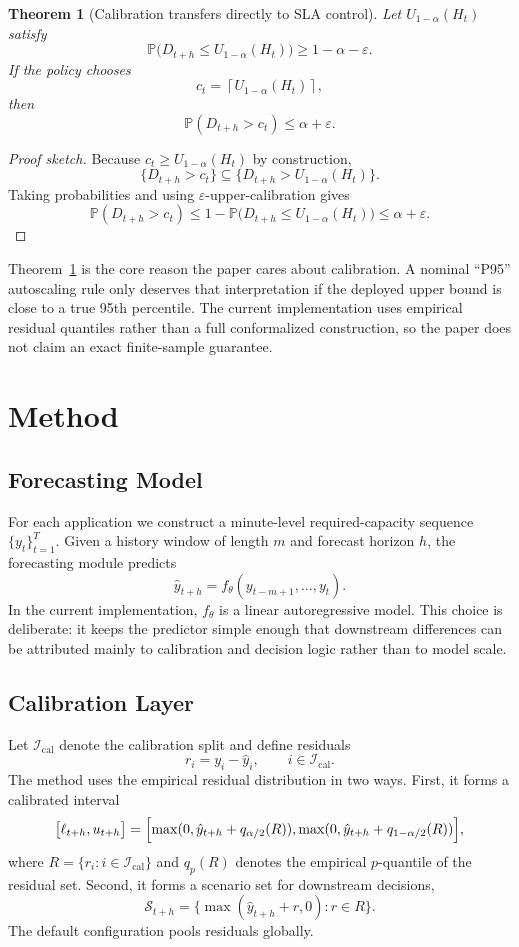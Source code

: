 \documentclass[11pt]{article}
\theoremstyle{plain}
\newtheorem{theorem}{Theorem}[section]
\theoremstyle{definition}
\theoremstyle{remark}
\begin{document}
\begin{theorem}[Calibration transfers directly to SLA control]
\label{thm:calibration-to-sla}
Let $U_{1-\alpha}(H_t)$ satisfy
\[
\mathbb{P}\!\bigl(D_{t+h} \le U_{1-\alpha}(H_t)\bigr) \ge 1-\alpha-\varepsilon.
\]
If the policy chooses
\[
c_t = \left\lceil U_{1-\alpha}(H_t) \right\rceil,
\]
then
\[
\mathbb{P}(D_{t+h} > c_t) \le \alpha + \varepsilon.
\]
\end{theorem}
\begin{proof}[Proof sketch]
Because $c_t \ge U_{1-\alpha}(H_t)$ by construction,
\[
\{D_{t+h} > c_t\} \subseteq \{D_{t+h} > U_{1-\alpha}(H_t)\}.
\]
Taking probabilities and using $\varepsilon$-upper-calibration gives
\[
\mathbb{P}(D_{t+h} > c_t)
\le
1 - \mathbb{P}\!\bigl(D_{t+h} \le U_{1-\alpha}(H_t)\bigr)
\le
\alpha + \varepsilon.
\]
\end{proof}

Theorem~\ref{thm:calibration-to-sla} is the core reason the paper cares about calibration. A nominal ``P95'' autoscaling rule only deserves that interpretation if the deployed upper bound is close to a true 95th percentile. The current implementation uses empirical residual quantiles rather than a full conformalized construction, so the paper does not claim an exact finite-sample guarantee.

\section{Method}
\label{sec:method}
\subsection{Forecasting Model}
For each application we construct a minute-level required-capacity sequence $\{y_t\}_{t=1}^T$. Given a history window of length $m$ and forecast horizon $h$, the forecasting module predicts
\[
\hat y_{t+h} = f_{\theta}(y_{t-m+1}, \ldots, y_t).
\]
In the current implementation, $f_\theta$ is a linear autoregressive model. This choice is deliberate: it keeps the predictor simple enough that downstream differences can be attributed mainly to calibration and decision logic rather than to model scale.

\subsection{Calibration Layer}
Let $\mathcal{I}_{\mathrm{cal}}$ denote the calibration split and define residuals
\[
r_i = y_i - \hat y_i, \qquad i \in \mathcal{I}_{\mathrm{cal}}.
\]
The method uses the empirical residual distribution in two ways. First, it forms a calibrated interval
\[
\bigl[\ell_{t+h}, u_{t+h}\bigr]
=
\Bigl[
\max(0,\hat y_{t+h}+q_{\alpha/2}(R)),
\max(0,\hat y_{t+h}+q_{1-\alpha/2}(R))
\Bigr],
\]
where $R=\{r_i : i\in\mathcal{I}_{\mathrm{cal}}\}$ and $q_p(R)$ denotes the empirical $p$-quantile of the residual set. Second, it forms a scenario set for downstream decisions,
\[
\mathcal{S}_{t+h} = \{\max(\hat y_{t+h}+r,0): r \in R\}.
\]
The default configuration pools residuals globally.
\end{document}
